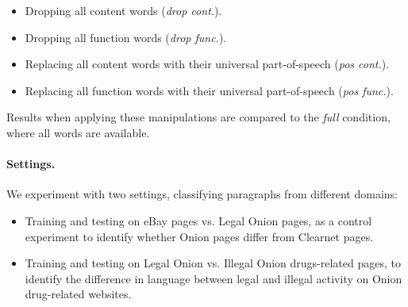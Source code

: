 \documentclass[11pt,a4paper,table]{article}
\begin{document}
\begin{itemize}
  \item Dropping all content words ({\it drop cont.}).
  \item Dropping all function words ({\it drop func.}).
  \item Replacing all content words with their universal part-of-speech ({\it pos cont.}).
  \item Replacing all function words with their universal part-of-speech ({\it pos func.}).
\end{itemize}

Results when applying these manipulations are compared to the {\it full} condition, where all
words are available.

\paragraph{Settings.}

We experiment with two settings, classifying paragraphs from different domains:
\begin{itemize}
  \item Training and testing on eBay pages vs. Legal Onion pages,
  as a control experiment
  to identify whether Onion pages differ from Clearnet pages.
  \item Training and testing on Legal Onion vs. Illegal Onion drugs-related pages,
  to identify the difference in language between legal and illegal activity
  on Onion drug-related websites.
  
\end{itemize}
\end{document}

